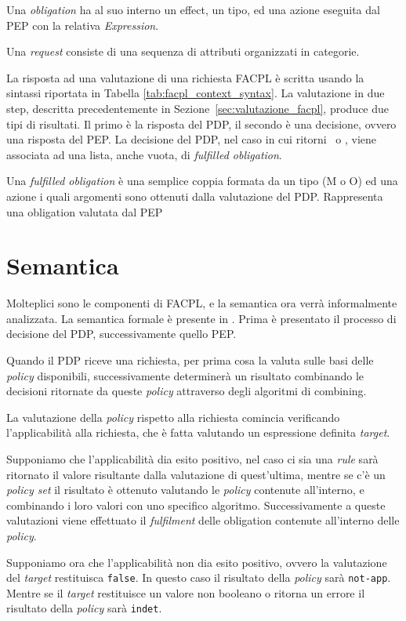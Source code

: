 Una \textit{obligation} ha al suo interno un effect, un tipo, ed una azione eseguita dal PEP con la relativa \textit{Expression}. \par
Una \textit{request} consiste di una sequenza di attributi organizzati in categorie. \par
La risposta ad una valutazione di una richiesta \ac{FACPL} è scritta usando la sintassi riportata in Tabella \ref{tab:facpl_context_syntax}.
La valutazione in due step, descritta precedentemente in Sezione~\ref{sec:valutazione_facpl}, produce due tipi di risultati. Il primo è la risposta del \ac{PDP}, il secondo è una decisione, ovvero una risposta del \ac{PEP}.
La decisione del \ac{PDP}, nel caso in cui ritorni \permit \ o \deny, viene associata ad una lista, anche vuota, di \textit{fulfilled obligation}. \par
Una \textit{fulfilled obligation} è una semplice coppia formata da un tipo (M o O) ed una azione i quali argomenti sono ottenuti dalla valutazione del \ac{PDP}. Rappresenta una obligation valutata dal \ac{PEP}

\section{Semantica}
\label{sec:semantica_originale}

Molteplici sono le componenti di \ac{FACPL}, e la semantica ora verrà informalmente analizzata. La semantica formale è presente in \cite{fullfacpl}.
Prima è presentato il processo di decisione del \ac{PDP}, successivamente quello \ac{PEP}. \par
Quando il \ac{PDP} riceve una richiesta, per prima cosa la valuta sulle basi delle \textit{policy} disponibili, successivamente determinerà un risultato combinando le decisioni ritornate da queste \textit{policy} attraverso degli algoritmi di combining. \par
La valutazione della \textit{policy} rispetto alla richiesta comincia verificando l'applicabilità alla richiesta, che è fatta valutando un espressione definita \textit{target}. \par
Supponiamo che l'applicabilità dia esito positivo, nel caso ci sia una \textit{rule} sarà ritornato il valore risultante dalla valutazione di quest'ultima, mentre se c'è un \textit{policy set} il risultato è ottenuto valutando le \textit{policy} contenute all'interno, e combinando i loro valori con uno specifico algoritmo. Successivamente a queste valutazioni viene effettuato il \textit{fulfilment} delle obligation contenute all'interno delle \textit{policy}. \par
Supponiamo ora che l'applicabilità non dia esito positivo, ovvero la valutazione del \textit{target} restituisca \texttt{false}. In questo caso il risultato della \textit{policy} sarà \texttt{not-app}. Mentre se il \textit{target} restituisce un valore non booleano o ritorna un errore il risultato della \textit{policy} sarà \texttt{indet}.

